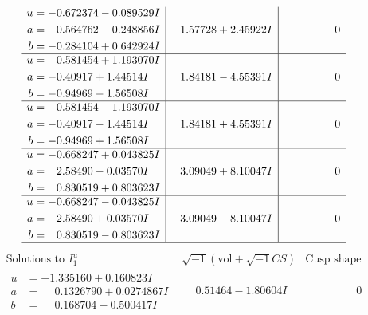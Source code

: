 \documentclass[1p]{elsarticle_modified}
\theoremstyle{definition}
\newcommand{\I}{\sqrt{-1}}
\begin{document}
$$\begin{array}{c|c|c}
\begin{aligned}
u &= -0.672374 - 0.089529 I \\
a &= \phantom{-}0.564762 - 0.248856 I \\
b &= -0.284104 + 0.642924 I\end{aligned}
 & \phantom{-}1.57728 + 2.45922 I & \phantom{-0.000000 } 0 \\ \hline\begin{aligned}
u &= \phantom{-}0.581454 + 1.193070 I \\
a &= -0.40917 + 1.44514 I \\
b &= -0.94969 - 1.56508 I\end{aligned}
 & \phantom{-}1.84181 - 4.55391 I & \phantom{-0.000000 } 0 \\ \hline\begin{aligned}
u &= \phantom{-}0.581454 - 1.193070 I \\
a &= -0.40917 - 1.44514 I \\
b &= -0.94969 + 1.56508 I\end{aligned}
 & \phantom{-}1.84181 + 4.55391 I & \phantom{-0.000000 } 0 \\ \hline\begin{aligned}
u &= -0.668247 + 0.043825 I \\
a &= \phantom{-}2.58490 - 0.03570 I \\
b &= \phantom{-}0.830519 + 0.803623 I\end{aligned}
 & \phantom{-}3.09049 + 8.10047 I & \phantom{-0.000000 } 0 \\ \hline\begin{aligned}
u &= -0.668247 - 0.043825 I \\
a &= \phantom{-}2.58490 + 0.03570 I \\
b &= \phantom{-}0.830519 - 0.803623 I\end{aligned}
 & \phantom{-}3.09049 - 8.10047 I & \phantom{-0.000000 } 0\\
 \hline 
 \end{array}$$\newpage$$\begin{array}{c|c|c}  
\text{Solutions to }I^u_{1}& \I (\text{vol} + \sqrt{-1}CS) & \text{Cusp shape}\\
 \hline 
\begin{aligned}
u &= -1.335160 + 0.160823 I \\
a &= \phantom{-}0.1326790 + 0.0274867 I \\
b &= \phantom{-}0.168704 - 0.500417 I\end{aligned}
 & \phantom{-}0.51464 - 1.80604 I & \phantom{-0.000000 } 0 \\ \hline\begin{aligned}

\end{aligned}
\end{array}$$
\end{document}
